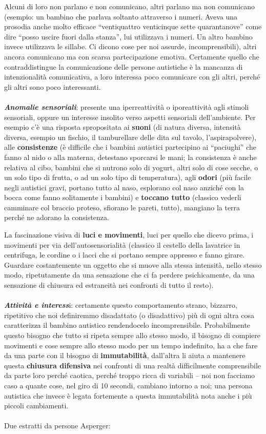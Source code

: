Alcuni di loro non parlano e non comunicano, altri parlano ma non
comunicano (esempio: un bambino che parlava soltanto attraverso i
numeri. Aveva una prosodia anche molto efficace ``ventiquattro
venticinque sette quarantanove'' come dire ``posso uscire fuori dalla
stanza'', lui utilizzava i numeri. Un altro bambino invece utilizzava le
sillabe. Ci dicono cose per noi assurde, incomprensibili), altri ancora
comunicano ma con scarsa partecipazione emotiva. Certamente quello che
contraddistingue la comunicazione delle persone autistiche è la mancanza
di intenzionalità comunicativa, a loro interessa poco comunicare con gli
altri, perché gli altri sono poco interessanti.
\\\\
\emph{\textbf{Anomalie sensoriali}}: presente una iperreattività o
iporeattività agli stimoli sensoriali, oppure un interesse insolito
verso aspetti sensoriali dell'ambiente. Per esempio c'è una risposta
spropositata ai \textbf{suoni} (di natura diversa, intensità diversa,
esempio un fischio, il tamburellare delle dita sul tavolo,
l'aspirapolvere), alle \textbf{consistenze} (è difficile che i bambini
autistici partecipino ai ``paciughi'' che fanno al nido o alla materna,
detestano sporcarsi le mani; la consistenza è anche relativa al cibo,
bambini che si nutrono solo di yogurt, altri solo di cose secche, o un
solo tipo di frutta, o ad un solo tipo di temperatura), agli
\textbf{odori} (più facile negli autistici gravi, portano tutto al naso,
esplorano col naso anziché con la bocca come fanno solitamente i
bambini) e \textbf{toccano tutto} (classico vederli camminare col
braccio proteso, sfiorano le pareti, tutto), mangiano la terra perché ne
adorano la consistenza.

La fascinazione visiva di \textbf{luci e movimenti}, luci per quello che
dicevo prima, i movimenti per via dell'autosensorialità (classico il
cestello della lavatrice in centrifuga, le cordine o i lacci che si
portano sempre appresso e fanno girare. Guardare costantemente un
oggetto che si muove alla stessa intensità, nello stesso modo,
ripetutamente da una sensazione che ci fa perdere psichicamente, da una
sensazione di chiusura ed estraneità nei confronti di tutto il resto).
\\\\
\emph{\textbf{Attività e interess}}i: certamente questo comportamento
strano, bizzarro, ripetitivo che noi definiremmo disadattato (o
disadattivo) più di ogni altra cosa caratterizza il bambino autistico
rendendocelo incomprensibile. Probabilmente questo bisogno che tutto si
ripeta sempre allo stesso modo, il bisogno di compiere movimenti e cose
sempre allo stesso modo per un tempo indefinito, ha a che fare da una
parte con il bisogno di \textbf{immutabilità}, dall'altra li aiuta a
mantenere questa \textbf{chiusura difensiva} nei confronti di una realtà
difficilmente comprensibile da parte loro perché caotica, perché troppo
ricca di variabili -- noi non facciamo caso a quante cose, nel giro di
10 secondi, cambiano intorno a noi; una persona autistica che invece è
legata fortemente a questa immutabilità nota anche i più piccoli
cambiamenti.
\\\\
Due estratti da persone Asperger:

